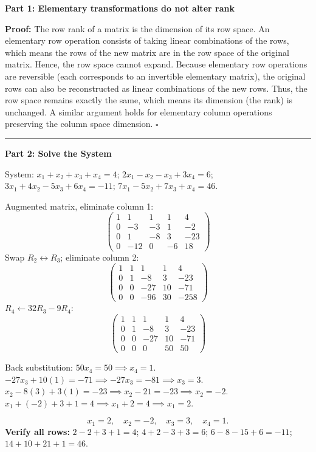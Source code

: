 \documentclass[12pt,a3paper]{article}
\begin{document}
\begin{tcolorbox}[enhanced,breakable,
  colback=cB!4,colframe=cB,boxrule=0.8pt,arc=5pt,
  title={\textbf{Answer --- Rank Invariance and Solve the $4\times4$ System}},
  fonttitle=\bfseries\color{white},colbacktitle=cB]

\textbf{Part 1: Elementary transformations do not alter rank}

\textbf{Proof:} The row rank of a matrix is the dimension of its row space. An elementary row operation consists of taking linear combinations of the rows, which means the rows of the new matrix are in the row space of the original matrix. Hence, the row space cannot expand. Because elementary row operations are reversible (each corresponds to an invertible elementary matrix), the original rows can also be reconstructed as linear combinations of the new rows. Thus, the row space remains exactly the same, which means its dimension (the rank) is unchanged. A similar argument holds for elementary column operations preserving the column space dimension. \hfill$\square$

\medskip\textcolor{cB}{\rule{\textwidth}{0.4pt}}\medskip

\textbf{Part 2: Solve the System}

System: $x_1+x_2+x_3+x_4=4$;\; $2x_1-x_2-x_3+3x_4=6$;\;
$3x_1+4x_2-5x_3+6x_4=-11$;\; $7x_1-5x_2+7x_3+x_4=46$.

Augmented matrix, eliminate column 1:
\[
\begin{pmatrix}1&1&1&1&4\\0&-3&-3&1&-2\\0&1&-8&3&-23\\0&-12&0&-6&18\end{pmatrix}
\]
Swap $R_2\leftrightarrow R_3$; eliminate column 2:
\[
\begin{pmatrix}1&1&1&1&4\\0&1&-8&3&-23\\0&0&-27&10&-71\\0&0&-96&30&-258\end{pmatrix}
\]
$R_4\leftarrow 32R_3-9R_4$:
\[
\begin{pmatrix}1&1&1&1&4\\0&1&-8&3&-23\\0&0&-27&10&-71\\0&0&0&50&50\end{pmatrix}
\]

Back substitution:
$50x_4 = 50 \implies x_4 = 1$.
$-27x_3 + 10(1) = -71 \implies -27x_3 = -81 \implies x_3 = 3$.
$x_2 - 8(3) + 3(1) = -23 \implies x_2 - 21 = -23 \implies x_2 = -2$.
$x_1 + (-2) + 3 + 1 = 4 \implies x_1 + 2 = 4 \implies x_1 = 2$.

\[
\boxed{x_1=2,\quad x_2=-2,\quad x_3=3,\quad x_4=1.}
\]
\textbf{Verify all rows:} $2-2+3+1=4$\;\checkmark;\; $4+2-3+3=6$\;\checkmark;\;
$6-8-15+6=-11$\;\checkmark;\; $14+10+21+1=46$\;\checkmark.

\end{tcolorbox}
\end{document}
